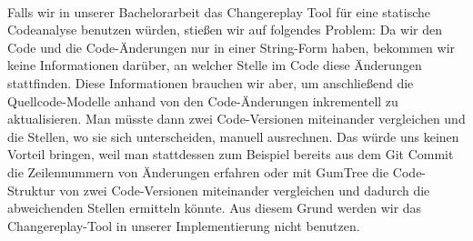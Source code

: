 \\
Falls wir in unserer Bachelorarbeit das Changereplay Tool für eine statische Codeanalyse benutzen würden, stießen wir auf folgendes Problem: Da wir den Code und die Code-Änderungen nur in einer String-Form haben, bekommen wir keine Informationen darüber, an welcher Stelle im Code diese Änderungen stattfinden. Diese Informationen brauchen wir aber, um anschließend die Quellcode-Modelle anhand von den Code-Änderungen inkrementell zu aktualisieren. Man müsste dann zwei Code-Versionen miteinander vergleichen und die Stellen, wo sie sich unterscheiden, manuell ausrechnen. Das würde uns keinen Vorteil bringen, weil man stattdessen zum Beispiel bereits aus dem Git Commit die Zeilennummern von Änderungen erfahren oder mit GumTree die Code-Struktur von zwei Code-Versionen miteinander vergleichen und dadurch die abweichenden Stellen ermitteln könnte. Aus diesem Grund werden wir das Changereplay-Tool in unserer Implementierung nicht benutzen.


